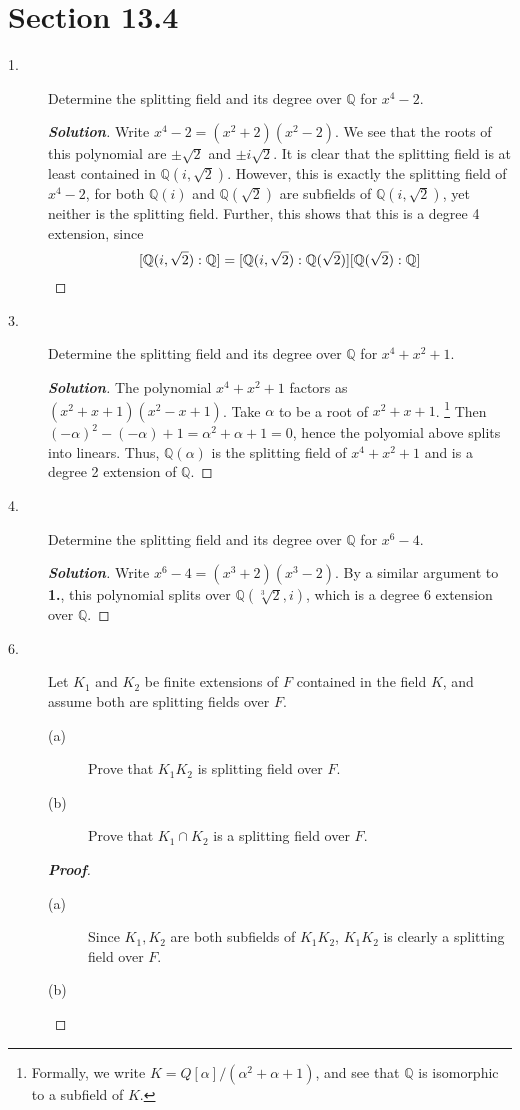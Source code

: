 \documentclass[12pt,leqno]{book}
\theoremstyle{definition}
\newcommand{\Q}{\mathbb{Q}}
\newenvironment{Proof}{\begin{proof}[\textnormal{\textbf{Proof}}]}{\end{proof}}
\newenvironment{Solution}{\begin{proof}[\textnormal{\textbf{Solution}}]}{\end{proof}}
\begin{document}
\section*{Section 13.4}
\begin{description}
 \item [1.] Determine the splitting field and its degree over $\Q$ for $x^4-2$.
  \begin{Solution}
   Write $x^4-2=(x^2+2)(x^2-2)$. We see that the roots of this polynomial are $\pm\sqrt{2}$ and $\pm i\sqrt{2}$. It is clear that the splitting field is at least contained in $\Q(i,\sqrt{2})$. However, this is exactly the splitting field of $x^4-2$, for both $\Q(i)$ and $\Q(\sqrt{2})$ are subfields of $\Q(i,\sqrt{2})$, yet neither is the splitting field. Further, this shows that this is a degree 4 extension, since \[[\Q(i,\sqrt{2}):\Q]=[\Q(i,\sqrt{2}):\Q(\sqrt{2})][\Q(\sqrt{2}):\Q]\qedhere\]
  \end{Solution}
 \item [3.] Determine the splitting field and its degree over $\Q$ for $x^4+x^2+1$.
  \begin{Solution}
   The polynomial $x^4+x^2+1$ factors as $(x^2+x+1)(x^2-x+1)$. Take $\alpha$ to be a root of $x^2+x+1$. \footnote{Formally, we write $K=Q[\alpha]/(\alpha^2+\alpha+1)$, and see that $\Q$ is isomorphic to a subfield of $K$.} Then $(-\alpha)^2-(-\alpha)+1=\alpha^2+\alpha+1=0$, hence the polyomial above splits into linears. Thus, $\Q(\alpha)$ is the splitting field of $x^4+x^2+1$ and is a degree 2 extension of $\Q$.
  \end{Solution}
 \item [4.] Determine the splitting field and its degree over $\Q$ for $x^6-4$.
  \begin{Solution}
   Write $x^6-4=(x^3+2)(x^3-2)$. By a similar argument to \textbf{1.}, this polynomial splits over $\Q(\sqrt[3]{2},i)$, which is a degree 6 extension over $\Q$.
  \end{Solution}
 \item [6.] Let $K_1$ and $K_2$ be finite extensions of $F$ contained in the field $K$, and assume both are splitting fields over $F$.
  \begin{description}
   \item [(a)] Prove that $K_1K_2$ is splitting field over $F$.
   \item [(b)] Prove that $K_1\cap K_2$ is a splitting field over $F$.
  \end{description}
  \begin{Proof}\indent
   \begin{description}
    \item [(a)] Since $K_1,K_2$ are both subfields of $K_1K_2$, $K_1K_2$ is clearly a splitting field over $F$.
    \item [(b)] 
   \end{description}
  \end{Proof}

\end{description}
\end{document}
